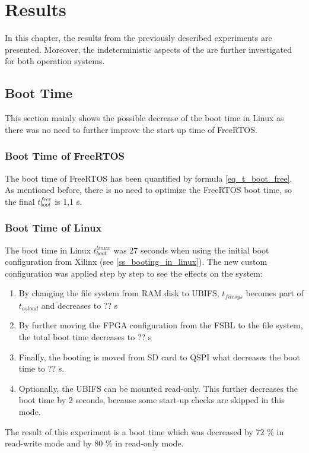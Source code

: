 \chapter{Results}\label{ch_results}
In this chapter, the results from the previously described experiments are presented.
Moreover, the indeterministic aspects of the are further investigated for both operation systems. 

\section{Boot Time}
This section mainly shows the possible decrease of the boot time in Linux as there was no need to further improve the start up time of FreeRTOS.

\subsection{Boot Time of FreeRTOS}
The boot time of FreeRTOS has been quantified by formula \ref{eq_t_boot_free}.
As mentioned before, there is no need to optimize the FreeRTOS boot time, so the final $ t_{boot}^{free} $ is 1,1 s.

\subsection{Boot Time of Linux}
The boot time in Linux $ t_{boot}^{linux} $ was 27 seconds when using the initial boot configuration from Xilinx (see \ref{ss_booting_in_linux}). 
The new custom configuration was applied step by step to see the effects on the system:

\begin{enumerate}
	\item By changing the file system from \ac{RAM} disk to \ac{UBIFS}, $t_{filesys}$ becomes part of $t_{osload}$ and decreases to ?? s
	\item By further moving the \ac{FPGA} configuration from the \ac{FSBL} to the file system, the total boot time decreases to ?? s 
	\item Finally, the booting is moved from \ac{SD} card to \ac{QSPI} what decreases the boot time to ?? s.
	\item Optionally, the \ac{UBIFS} can be mounted read-only. This further decreases the boot time by 2 seconds, because some start-up checks are skipped in this mode. 
\end{enumerate}

The result of this experiment is a boot time which was decreased by 72 \% in read-write mode and by 80 \% in read-only mode.

